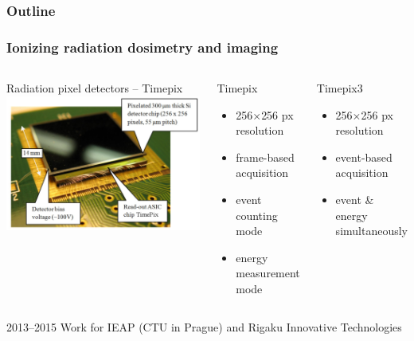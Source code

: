 \documentclass[aspectratio=169]{beamer}
\begin{document}
\begin{frame}
  \frametitle{Outline}
  \tableofcontents[currentsection]
\end{frame}



\begin{frame}
\frametitle{Ionizing radiation dosimetry and imaging}

  \begin{columns}[c]

  \begin{block}{Radiation pixel detectors -- Timepix}
    \includegraphics[width=1.0\textwidth]{./fig/timepix.jpg}
  \end{block} 

  \begin{block}{Timepix}
    \begin{itemize}
      \item 256$\times$256 px resolution
      \item frame-based acquisition
      \item event counting mode
      \item energy measurement mode
    \end{itemize}
  \end{block}

  \begin{block}{Timepix3}
    \begin{itemize}
      \item 256$\times$256 px resolution
      \item event-based acquisition
      \item event \& energy simultaneously
    \end{itemize}
  \end{block}

  \end{columns}

  \begin{block}{2013--2015}
    Work for IEAP (CTU in Prague) and Rigaku Innovative Technologies 
  \end{block}

\end{frame}
\end{document}
